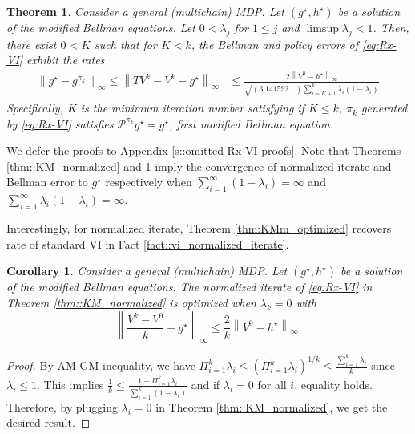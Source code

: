 \documentclass{article} %
\newcommand{\cP}{\mathcal{P}}
\newcommand*{\infn}[1]{\left\|{#1}\right\|_{\infty}}
\newtheorem{theorem}{Theorem}
\newtheorem{corollary}{Corollary}
\begin{document}
\begin{theorem}\label{thm::KM_bellman}
Consider a general (multichain) MDP. Let $(g^{\star},h^{\star})$ be a solution of the modified Bellman equations. Let $0<\lambda_j$ for $1 \le j$ and $\limsup \lambda_j <1  $. Then, there exist $ 0<K$ such that for $K < k$, the Bellman and policy errors of \ref{eq:Rx-VI} exhibit the rates
        \begin{align*}
        \infn{g^{\star}-g^{\pi_k}} \le \infn{TV^k-V^k-g^{\star}} &\le \frac{2\infn{V^0-h^{\star}}}{\sqrt{(3.141592\dots)\sum^{k}_{i=K+1} \lambda_i(1-\lambda_{i})}}
    \end{align*}
    Specifically, $K$ is the minimum iteration number satisfying if $K\le k$, $\pi_k$ generated by \ref{eq:Rx-VI} satisfies $\cP^{\pi_k}g^{\star}=g^{\star}$, first modified Bellman equation.
\end{theorem}

We defer the proofs to Appendix \ref{s::omitted-Rx-VI-proofs}. Note that Theorems \ref{thm::KM_normalized} and \ref{thm::KM_bellman} imply the convergence of normalized iterate and Bellman error to $g^{\star}$ respectively when $\sum^{\infty}_{i=1} (1-\lambda_{i}) = \infty$ and $\sum^{\infty}_{i=1} \lambda_i(1-\lambda_{i})=\infty$. 

Interestingly, for normalized iterate, Theorem \ref{thm:KMm_optimized} recovers rate of standard VI in Fact \ref{fact::vi_normalized_iterate}. 
\begin{corollary}
    Consider a general (multichain) MDP. Let $(g^{\star},h^{\star})$ be a solution of the modified Bellman equations. The normalized iterate of \ref{eq:Rx-VI} in Theorem \ref{thm::KM_normalized} is optimized when $\lambda_k=0$ with
  \[\infn{\frac{V^k-V^0}{k}-g^{\star}} \le \frac{2}{k}\infn{V^0-h^{\star}}.\]
\end{corollary}
\begin{proof}
By AM-GM inequality, we have $\Pi^{k}_{i=1}\lambda_{i} \le (\Pi^{k}_{i=1}\lambda_{i})^{1/k} \le \frac{\sum^{k}_{i=1} \lambda_{i}}{k}$ since $\lambda_{i} \le 1$. This implies $ \frac{1}{k} \le \frac{1-\Pi^{k}_{i=1}\lambda_{i}}{\sum^{k}_{i=1} (1-\lambda_{i})} $ and if $\lambda_i=0$ for all $i$, equality holds. Therefore, by plugging $\lambda_i=0$ in Theorem \ref{thm::KM_normalized}, we get the desired result.   
\end{proof}
\end{document}
